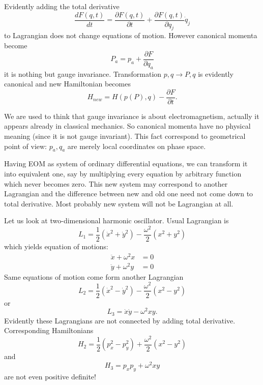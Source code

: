 Evidently adding the total derivative
\begin{equation*}
    \frac{d F (q,t)}{d t}=\frac{\partial F(q,t)}{\partial t} + \frac{ \partial F (q,t)}{\partial q_j} \dot q_j
\end{equation*}
to Lagrangian does not change equations of motion. However canonical momenta
become
\[ P_a=p_a+\frac{\partial F}{\partial q_a} \]
it is nothing but gauge invariance. Transformation $ p,q \rightarrow P,q $ is evidently
canonical and new Hamiltonian becomes 
\[ H_{new}=H(p(P),q)- \frac{\partial F}{\partial t}.\]

We are used to think that gauge invariance is about electromagnetism, actually it appears
already in classical mechanics. 
So canonical momenta have no physical meaning (since it is not gauge invariant).
This fact correspond to geometrical point of view: $p_a,q_a$ are merely local
coordinates on phase space.

Having EOM as system of ordinary differential equations,
we can transform it into equivalent one, say by multiplying every equation by arbitrary 
function which never becomes zero. This new system may correspond to another Lagrangian and
the difference between new and old one need not come down to total derivative. Most probably
new system will not be Lagrangian at all.

Let us look at two-dimensional harmonic oscillator.
Usual Lagrangian is
\begin{equation}
   \label {ho1}
    L_1= \frac{1}{2} (\dot x^2+\dot y^2) -\frac{ \omega^2}{2} ( x^2+ y^2)
\end{equation}
which yields equation  of motions:
\begin{equation}
   \label {hoe1}
   \begin{split}
       \ddot x+ \omega^2 x & =0 \\
       \ddot y+ \omega^2 y & =0 
   \end{split}
\end{equation}
Same equations of motion come form 
another Lagrangian
\begin{equation}
   \label {ho2}
    L_2= \frac{1}{2} (\dot x^2-\dot y^2) -\frac{ \omega^2}{2} ( x^2- y^2)
\end{equation}
or
\begin{equation}
   \label {ho3}
    L_3= \dot x\dot y - \omega^2  x y .
\end{equation}
Evidently these Lagrangians are not connected by adding total derivative.
Corresponding  Hamiltonians 
\begin{equation}
   \label {ho2h}
    H_2= \frac{1}{2} ( p_x^2-p_y^2) +\frac{ \omega^2}{2} ( x^2- y^2)
\end{equation}
and
\begin{equation}
   \label {ho3h}
    H_3= p_x p_y +\omega^2  x y
\end{equation}
are not even positive definite!

